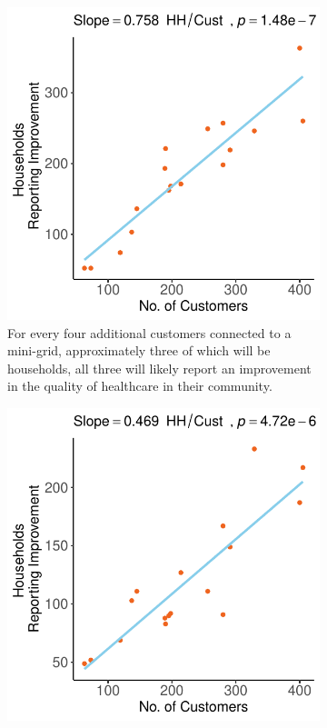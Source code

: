 \begin{figure}[t]
    \centering
    \begin{subfigure}[t]{0.48\textwidth}
        \centering
        \includegraphics[width=\textwidth]{images/better_access_health_minigrid_regression_community.pdf}
        \caption{For every four additional customers connected to a mini-grid, approximately three of which will be households, all three will likely report an improvement in the quality of healthcare in their community.}
        \label{fig:better_healthcare}
    \end{subfigure}
    \hfill
    \begin{subfigure}[t]{0.48\textwidth}
        \centering
        \includegraphics[width=\textwidth]{images/minigrid_access_life_improvement_regression_community.pdf}

\end{subfigure}
\end{figure}
